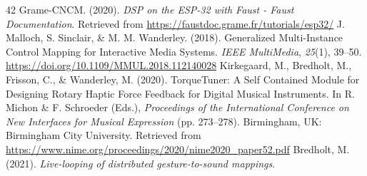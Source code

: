 \documentclass[sigconf]{nimeart}
\begin{document}
\begin{thebibliography}{42}
 {{ }}  Grame-CNCM. (2020). \emph{DSP on the ESP-32 with Faust - Faust Documentation}. Retrieved from \url{https://faustdoc.grame.fr/tutorials/esp32/}{}
 {{ }}  J. Malloch, S. Sinclair, \& M. M. Wanderley. (2018). Generalized Multi-Instance Control Mapping for Interactive Media Systems. \emph{IEEE MultiMedia}, \emph{25}(1), 39--50. \url{https://doi.org/10.1109/MMUL.2018.112140028}{}
 {{ }}  Kirkegaard, M., Bredholt, M., Frisson, C., \& Wanderley, M. (2020). TorqueTuner: A Self Contained Module for Designing Rotary Haptic Force Feedback for Digital Musical Instruments. In R. Michon \& F. Schroeder (Eds.), \emph{Proceedings of the International Conference on New Interfaces for Musical Expression} (pp. 273--278). Birmingham, UK: Birmingham City University. Retrieved from \url{https://www.nime.org/proceedings/2020/nime2020_paper52.pdf}{}
 {{ }}  Bredholt, M. (2021). \emph{Live-looping of distributed gesture-to-sound mappings}.{}
\end{thebibliography}
\end{document}
